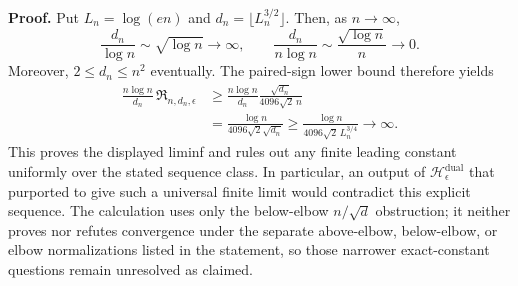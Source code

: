 \textbf{Proof.}
Put \(L_n=\log(en)\) and \(d_n=\lfloor L_n^{3/2}\rfloor\).  Then, as \(n\to\infty\),
\[
 \frac{d_n}{\log n}\sim\sqrt{\log n}\longrightarrow\infty,
 \qquad
 \frac{d_n}{n\log n}\sim\frac{\sqrt{\log n}}n\longrightarrow0.
\]
Moreover, \(2\leq d_n\leq n^2\) eventually.  The paired-sign lower bound therefore yields
\[
 \begin{aligned}
 \frac{n\log n}{d_n}\,
 \mathfrak R_{n,d_n,\epsilon}
 &\geq
 \frac{n\log n}{d_n}
 \frac{\sqrt{d_n}}{4096\sqrt2\,n}\\
 &=\frac{\log n}{4096\sqrt2\sqrt{d_n}}
 \geq\frac{\log n}{4096\sqrt2\,L_n^{3/4}}
 \longrightarrow\infty.
 \end{aligned}
\]
This proves the displayed liminf and rules out any finite leading constant uniformly over the stated sequence class.  In particular, an output of \(\mathscr H_\epsilon^{\mathrm{dual}}\) that purported to give such a universal finite limit would contradict this explicit sequence.  The calculation uses only the below-elbow \(n/\sqrt d\) obstruction; it neither proves nor refutes convergence under the separate above-elbow, below-elbow, or elbow normalizations listed in the statement, so those narrower exact-constant questions remain unresolved as claimed.